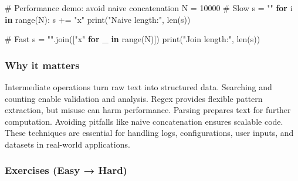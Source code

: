 \documentclass[
  letterpaper,
  DIV=11,
  numbers=noendperiod]{scrreprt}
\newenvironment{Shaded}{\begin{snugshade}}{\end{snugshade}}
\newcommand{\BuiltInTok}[1]{\textcolor[rgb]{0.00,0.23,0.31}{#1}}
\newcommand{\CommentTok}[1]{\textcolor[rgb]{0.37,0.37,0.37}{#1}}
\newcommand{\ControlFlowTok}[1]{\textcolor[rgb]{0.00,0.23,0.31}{\textbf{#1}}}
\newcommand{\DecValTok}[1]{\textcolor[rgb]{0.68,0.00,0.00}{#1}}
\newcommand{\KeywordTok}[1]{\textcolor[rgb]{0.00,0.23,0.31}{\textbf{#1}}}
\newcommand{\NormalTok}[1]{\textcolor[rgb]{0.00,0.23,0.31}{#1}}
\newcommand{\OperatorTok}[1]{\textcolor[rgb]{0.37,0.37,0.37}{#1}}
\newcommand{\StringTok}[1]{\textcolor[rgb]{0.13,0.47,0.30}{#1}}
\begin{document}
\begin{Shaded}
\begin{Highlighting}[]
\CommentTok{\# Performance demo: avoid naive concatenation}
\NormalTok{N }\OperatorTok{=} \DecValTok{10000}
\CommentTok{\# Slow}
\NormalTok{s }\OperatorTok{=} \StringTok{""}
\ControlFlowTok{for}\NormalTok{ i }\KeywordTok{in} \BuiltInTok{range}\NormalTok{(N):}
\NormalTok{    s }\OperatorTok{+=} \StringTok{"x"}
\BuiltInTok{print}\NormalTok{(}\StringTok{"Naive length:"}\NormalTok{, }\BuiltInTok{len}\NormalTok{(s))}

\CommentTok{\# Fast}
\NormalTok{s }\OperatorTok{=} \StringTok{""}\NormalTok{.join([}\StringTok{"x"} \ControlFlowTok{for}\NormalTok{ \_ }\KeywordTok{in} \BuiltInTok{range}\NormalTok{(N)])}
\BuiltInTok{print}\NormalTok{(}\StringTok{"Join length:"}\NormalTok{, }\BuiltInTok{len}\NormalTok{(s))}
\end{Highlighting}
\end{Shaded}

\subsubsection{Why it matters}\label{why-it-matters-34}

Intermediate operations turn raw text into structured data. Searching
and counting enable validation and analysis. Regex provides flexible
pattern extraction, but misuse can harm performance. Parsing prepares
text for further computation. Avoiding pitfalls like naive concatenation
ensures scalable code. These techniques are essential for handling logs,
configurations, user inputs, and datasets in real-world applications.

\subsubsection{Exercises (Easy → Hard)}\label{exercises-easy-hard}
\end{document}
